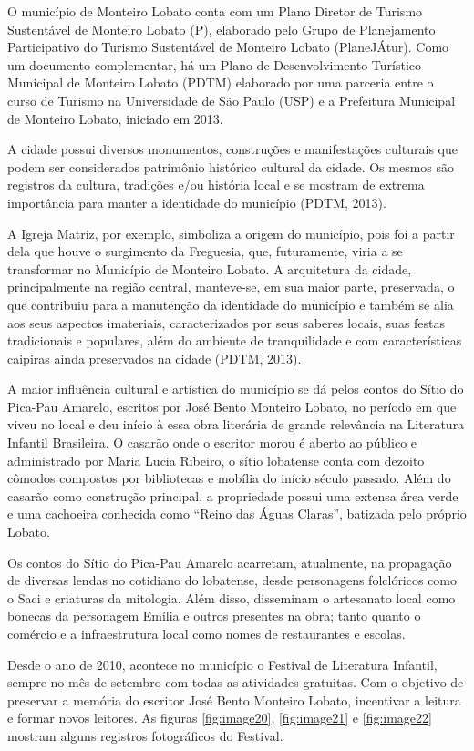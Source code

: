 O município de Monteiro Lobato conta com um Plano Diretor de Turismo Sustentável de Monteiro Lobato (P), elaborado pelo Grupo de Planejamento Participativo do Turismo Sustentável de Monteiro Lobato (PlaneJÁtur). Como um documento complementar, há um Plano de Desenvolvimento Turístico Municipal de Monteiro Lobato (PDTM) elaborado por uma parceria entre o curso de Turismo na Universidade de São Paulo (USP) e a Prefeitura Municipal de Monteiro Lobato, iniciado em 2013.

A cidade possui diversos monumentos, construções e manifestações culturais que podem ser considerados patrimônio histórico cultural da cidade. Os mesmos são registros da cultura, tradições e/ou história local e se mostram de extrema importância para manter a identidade do município (PDTM, 2013).

A Igreja Matriz, por exemplo, simboliza a origem do município, pois foi a partir dela que houve o surgimento da Freguesia, que, futuramente, viria a se transformar no Município de Monteiro Lobato. A arquitetura da cidade, principalmente na região central, manteve-se, em sua maior parte, preservada, o que contribuiu para a manutenção da identidade do município e também se alia aos seus aspectos imateriais, caracterizados por seus saberes locais, suas festas tradicionais e populares, além do ambiente de tranquilidade e com características caipiras ainda preservados na cidade (PDTM, 2013).

A maior influência cultural e artística do município se dá pelos contos do Sítio do Pica-Pau Amarelo, escritos por José Bento Monteiro Lobato, no período em que viveu no local e deu início à essa obra literária de grande relevância na Literatura Infantil Brasileira. O casarão onde o escritor morou é aberto ao público e administrado por Maria Lucia Ribeiro, o sítio lobatense conta com dezoito cômodos compostos por bibliotecas e mobília do início século passado. Além do casarão como construção principal, a propriedade possui uma extensa área verde e uma cachoeira conhecida como “Reino das Águas Claras”, batizada pelo próprio Lobato.

Os contos do Sítio do Pica-Pau Amarelo acarretam, atualmente, na propagação de diversas lendas no cotidiano do lobatense, desde personagens folclóricos como o Saci e criaturas da mitologia. Além disso, disseminam o artesanato local como bonecas da personagem Emília e outros presentes na obra; tanto quanto o comércio e a infraestrutura local como nomes de restaurantes e escolas.

Desde o ano de 2010, acontece no município o Festival de Literatura Infantil, sempre no mês de setembro com todas as atividades gratuitas. Com o objetivo de preservar a memória do escritor José Bento Monteiro Lobato, incentivar a leitura e formar novos leitores. As figuras \ref{fig:image20}, \ref{fig:image21} e \ref{fig:image22} mostram alguns registros fotográficos do Festival.
 
